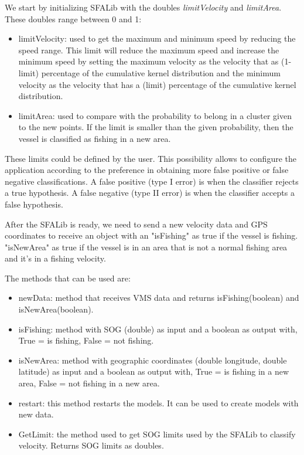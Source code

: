 We start by initializing SFALib with the doubles \emph{limitVelocity} and \emph{limitArea}. These doubles range between 0 and 1:
\begin{itemize}
\item limitVelocity: used to get the maximum and minimum speed by reducing the speed range. This limit will reduce the maximum speed and increase the minimum speed by setting the maximum velocity as the velocity that as (1-limit) percentage of the cumulative kernel distribution and the minimum velocity as the velocity that has a (limit) percentage of the cumulative kernel distribution.
\item limitArea: used to compare with the probability to belong in a cluster given to the new points. If the limit is smaller than the given probability, then the vessel is classified as fishing in a new area.
\end{itemize}
These limits could be defined by the user. This possibility allows to configure the application according to the preference in obtaining more false positive or false negative classifications.
A false positive (type I error) is when the classifier rejects a true hypothesis.
A false negative (type II error) is when the classifier accepts a false hypothesis.

After the SFALib is ready, we need to send a new velocity data and GPS coordinates to receive an object with an "isFishing" as true if the vessel is fishing. "isNewArea" as true if the vessel is in an area that is not a normal fishing area and it's in a fishing velocity.

The methods that can be used are:
\begin{itemize}
\item newData: method that receives VMS data and returns isFishing(boolean) and isNewArea(boolean).
\item isFishing: method with SOG (double) as input and a boolean as output with, True = is fishing, False = not fishing.
\item isNewArea: method with geographic coordinates (double longitude, double latitude) as input and a boolean as output with, True = is fishing in a new area, False = not fishing in a new area.
\item restart: this method restarts the models. It can be used to create models with new data.
\item GetLimit: the method used to get SOG limits used by the SFALib to classify velocity. Returns SOG limits as doubles.
\end{itemize}






